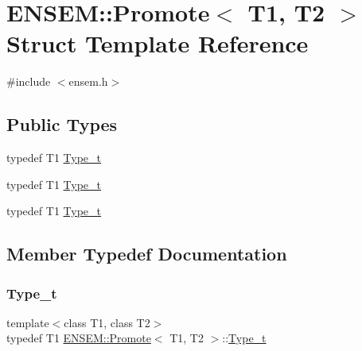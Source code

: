 \hypertarget{structENSEM_1_1Promote}{}\section{E\+N\+S\+EM\+:\+:Promote$<$ T1, T2 $>$ Struct Template Reference}
\label{structENSEM_1_1Promote}


{\ttfamily \#include $<$ensem.\+h$>$}

\subsection*{Public Types}
\begin{DoxyCompactItemize}
\item 
typedef T1 \mbox{\hyperlink{structENSEM_1_1Promote_a6a7260634b484365b9d70ccf3c0fd6fd}{Type\+\_\+t}}
\item 
typedef T1 \mbox{\hyperlink{structENSEM_1_1Promote_a6a7260634b484365b9d70ccf3c0fd6fd}{Type\+\_\+t}}
\item 
typedef T1 \mbox{\hyperlink{structENSEM_1_1Promote_a6a7260634b484365b9d70ccf3c0fd6fd}{Type\+\_\+t}}
\end{DoxyCompactItemize}


\subsection{Member Typedef Documentation}
\mbox{\label{structENSEM_1_1Promote_a6a7260634b484365b9d70ccf3c0fd6fd}} 
\subsubsection{\texorpdfstring{Type\_t}{Type\_t}\hspace{0.1cm}{\footnotesize\ttfamily [1/3]}}
{\footnotesize\ttfamily template$<$class T1, class T2$>$ \\
typedef T1 \mbox{\hyperlink{structENSEM_1_1Promote}{E\+N\+S\+E\+M\+::\+Promote}}$<$ T1, T2 $>$\+::\mbox{\hyperlink{structENSEM_1_1Promote_a6a7260634b484365b9d70ccf3c0fd6fd}{Type\+\_\+t}}}

\mbox{\label{structENSEM_1_1Promote_a6a7260634b484365b9d70ccf3c0fd6fd}} 
